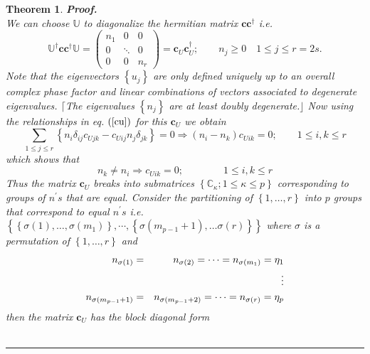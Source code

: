 \documentclass[aps,preprint]{revtex4}
\newtheorem{theorem}{Theorem}
\newenvironment{proof}[1][Proof]{\noindent\textbf{#1.} }{\ \rule{0.5em}{0.5em}}
\begin{document}
\begin{theorem}
\begin{proof}
\begin{equation}
\end{equation}%
We can choose $\mathbb{U}$ to diagonalize the hermitian matrix $\mathbf{cc}%
^{\dagger }$ i.e.%
\begin{equation}
\mathbb{U}^{\dagger }\mathbf{cc}\mathbb{^{\dagger }U}=\left( 
\begin{array}{ccc}
n_{1} & 0 & 0 \\ 
0 & \ddots & 0 \\ 
0 & 0 & n_{r}%
\end{array}%
\right) =\mathbf{c}_{U}\mathbf{c}_{U}^{\dagger };\qquad n_{j}\geq 0\quad
1\leq j\leq r=2s.
\end{equation}%
Note that the eigenvectors $\left\{ u_{j}\right\} $ are only defined
uniquely up to an overall complex phase factor and linear combinations of
vectors associated to degenerate eigenvalues. $\lceil $The eigenvalues $%
\left\{ n_{j}\right\} $ are at least doubly degenerate.$\rfloor $ Now using
the relationships in eq. $\left( \ref{cu}\right) $ for this $\mathbf{c}_{U}$
we obtain%
\begin{equation}
\sum_{1\leq j\leq r}\left\{ n_{i}\delta _{ij}c_{Ujk}-c_{Uij}n_{j}\delta
_{jk}\right\} =0\Rightarrow \left( n_{i}-n_{k}\right) c_{Uik}=0;\qquad 1\leq
i,k\leq r
\end{equation}%
which shows that 
\begin{equation}
n_{k}\neq n_{i}\Rightarrow c_{Uik}=0;\qquad \qquad 1\leq i,k\leq r
\end{equation}%
Thus the matrix $\mathbf{c}_{U}$ breaks into submatrices $\left\{ \mathbb{C}%
_{\kappa };1\leq \kappa \leq p\right\} $ corresponding to groups of $%
n^{\prime }s$ that are equal. Consider the partitioning of $\left\{ 1,\ldots
,r\right\} $ into $p$ groups that correspond to equal $n^{\prime }s$ i.e. $%
\left\{ \left\{ \sigma \left( 1\right) ,\ldots ,\sigma \left( m_{1}\right)
\right\} ,\cdots ,\left\{ \sigma \left( m_{p-1}+1\right) ,\ldots \sigma
\left( r\right) \right\} \right\} $ where $\sigma $ is a permutation of $%
\left\{ 1,\ldots ,r\right\} $ and 
\begin{eqnarray}
n_{\sigma \left( 1\right) } &=&n_{\sigma \left( 2\right) }=\cdots =n_{\sigma
\left( m_{1}\right) }=\eta _{1}  \notag \\
&&\vdots  \notag \\
n_{\sigma \left( m_{p-1}+1\right) } &=&n_{\sigma \left( m_{p-1}+2\right)
}=\cdots =n_{\sigma \left( r\right) }=\eta _{p}
\end{eqnarray}%
then the matrix $\mathbf{c}_{U}$ has the block diagonal form 
\begin{equation}

\end{equation}
\end{proof}
\end{theorem}
\end{document}
